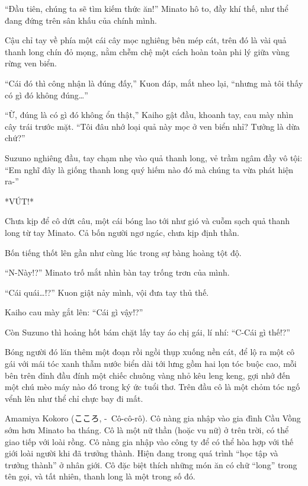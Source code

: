\documentclass[../main.tex]{subfiles}
\begin{document}
\ct

``Đầu tiên, chúng ta sẽ tìm kiếm thức ăn!'' Minato hô to, đầy khí thế, như thể đang đứng trên sân khấu của chính mình.

Cậu chỉ tay về phía một cái cây mọc nghiêng bên mép cát, trên đó là vài quả thanh long chín đỏ mọng, nằm chễm chệ một cách hoàn toàn phi lý giữa vùng rừng ven biển.

``Cái đó thì công nhận là đúng đấy,'' Kuon đáp, mắt nheo lại, ``nhưng mà tôi thấy có gì đó không đúng\dots''

``Ừ, đúng là có gì đó không ổn thật,'' Kaiho gật đầu, khoanh tay, cau mày nhìn cây trái trước mặt. ``Tôi đâu nhớ loại quả này mọc ở ven biển nhỉ? Tưởng là dừa chứ?''

Suzuno nghiêng đầu, tay chạm nhẹ vào quả thanh long, vẻ trầm ngâm đầy vô tội: ``Em nghĩ đây là giống thanh long quý hiếm nào đó mà chúng ta vừa phát hiện ra-''

*VÚT!*


Chưa kịp để cô dứt câu, một cái bóng lao tới như gió và cuỗm sạch quả thanh long từ tay Minato. Cả bốn người ngơ ngác, chưa kịp định thần.

Bốn tiếng thốt lên gần như cùng lúc trong sự bàng hoàng tột độ.

``N-Này!?'' Minato trố mắt nhìn bàn tay trống trơn của mình.

``Cái quái\dots!?'' Kuon giật nảy mình, vội đưa tay thủ thế.

Kaiho cau mày gắt lên: ``Cái gì vậy!?''

Còn Suzuno thì hoảng hốt bám chặt lấy tay áo chị gái, lí nhí: ``C-Cái gì thế!?''

Bóng người đó lăn thêm một đoạn rồi ngồi thụp xuống nền cát, để lộ ra một cô gái với mái tóc xanh thẫm nước biển dài tới lưng gồm hai lọn tóc buộc cao, mỗi bên trên đỉnh đầu đính một chiếc chuông vàng nhỏ kêu leng keng, gợi nhớ đến một chú mèo máy nào đó trong ký ức tuổi thơ. Trên đầu cô là một chỏm tóc ngố vểnh lên như thể chỉ chực bay đi mất.

\chrint


Amamiya Kokoro (こころ, -\ Cô-cô-rô). Cô nàng gia nhập vào gia đình Cầu Vồng sớm hơn Minato ba tháng. Cô là một nữ thần (hoặc vu nữ) ở trên trời, có thể giao tiếp với loài rồng. Cô nàng gia nhập vào công ty để có thể hòa hợp với thế giới loài người khi đã trưởng thành. Hiện đang trong quá trình ``học tập và trưởng thành'' ở nhân giới. Cô đặc biệt thích những món ăn có chữ ``long'' trong tên gọi, và tất nhiên, thanh long là một trong số đó.
\end{document}
